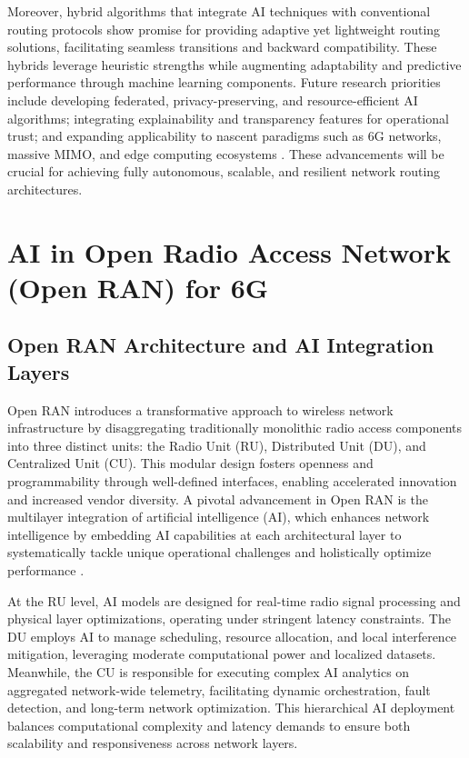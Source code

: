 Moreover, hybrid algorithms that integrate AI techniques with conventional routing protocols show promise for providing adaptive yet lightweight routing solutions, facilitating seamless transitions and backward compatibility. These hybrids leverage heuristic strengths while augmenting adaptability and predictive performance through machine learning components. Future research priorities include developing federated, privacy-preserving, and resource-efficient AI algorithms; integrating explainability and transparency features for operational trust; and expanding applicability to nascent paradigms such as 6G networks, massive MIMO, and edge computing ecosystems \cite{ref53}. These advancements will be crucial for achieving fully autonomous, scalable, and resilient network routing architectures.

\section{AI in Open Radio Access Network (Open RAN) for 6G}

\subsection{Open RAN Architecture and AI Integration Layers}

Open RAN introduces a transformative approach to wireless network infrastructure by disaggregating traditionally monolithic radio access components into three distinct units: the Radio Unit (RU), Distributed Unit (DU), and Centralized Unit (CU). This modular design fosters openness and programmability through well-defined interfaces, enabling accelerated innovation and increased vendor diversity. A pivotal advancement in Open RAN is the multilayer integration of artificial intelligence (AI), which enhances network intelligence by embedding AI capabilities at each architectural layer to systematically tackle unique operational challenges and holistically optimize performance \cite{ref54}.

At the RU level, AI models are designed for real-time radio signal processing and physical layer optimizations, operating under stringent latency constraints. The DU employs AI to manage scheduling, resource allocation, and local interference mitigation, leveraging moderate computational power and localized datasets. Meanwhile, the CU is responsible for executing complex AI analytics on aggregated network-wide telemetry, facilitating dynamic orchestration, fault detection, and long-term network optimization. This hierarchical AI deployment balances computational complexity and latency demands to ensure both scalability and responsiveness across network layers.

